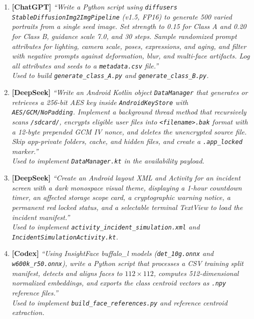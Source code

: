 \documentclass{article}
\begin{document}
\begin{enumerate}
    \item \textbf{[ChatGPT]} \textit{``Write a Python script using \texttt{diffusers} \texttt{StableDiffusionImg2ImgPipeline} (v1.5, FP16) to generate 500 varied portraits from a single seed image. Set strength to 0.15 for Class A and 0.20 for Class B, guidance scale 7.0, and 30 steps. Sample randomized prompt attributes for lighting, camera scale, poses, expressions, and aging, and filter with negative prompts against deformation, blur, and multi-face artifacts. Log all attributes and seeds to a \texttt{metadata.csv} file.''} \\
    \textit{Used to build \texttt{generate\_class\_A.py} and \texttt{generate\_class\_B.py}.}

    \item \textbf{[DeepSeek]} \textit{``Write an Android Kotlin object \texttt{DataManager} that generates or retrieves a 256-bit AES key inside \texttt{AndroidKeyStore} with \texttt{AES/GCM/NoPadding}. Implement a background thread method that recursively scans \texttt{/sdcard/}, encrypts eligible user files into \texttt{<filename>.bak} format with a 12-byte prepended GCM IV nonce, and deletes the unencrypted source file. Skip app-private folders, cache, and hidden files, and create a \texttt{.app\_locked} marker.''} \\
    \textit{Used to implement \texttt{DataManager.kt} in the availability payload.}

    \item \textbf{[DeepSeek]} \textit{``Create an Android layout XML and Activity for an incident screen with a dark monospace visual theme, displaying a 1-hour countdown timer, an affected storage scope card, a cryptographic warning notice, a permanent red locked status, and a selectable terminal TextView to load the incident manifest.''} \\
    \textit{Used to implement \texttt{activity\_incident\_simulation.xml} and \texttt{IncidentSimulationActivity.kt}.}

    \item \textbf{[Codex]} \textit{``Using InsightFace buffalo\_l models (\texttt{det\_10g.onnx} and \texttt{w600k\_r50.onnx}), write a Python script that processes a CSV training split manifest, detects and aligns faces to $112\times112$, computes 512-dimensional normalized embeddings, and exports the class centroid vectors as \texttt{.npy} reference files.''} \\
    \textit{Used to implement \texttt{build\_face\_references.py} and reference centroid extraction.}


\end{enumerate}
\end{document}

